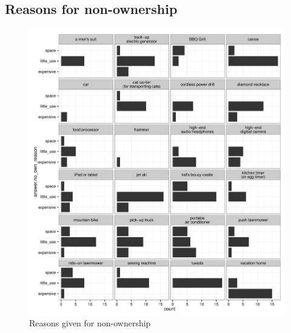 \documentclass[11pt]{article}
\begin{document}
\subsection{Reasons for non-ownership} 


\begin{figure}
\centering 
\caption{Reasons given for non-ownership}
\begin{minipage}{0.90 \linewidth}
\includegraphics[width = \linewidth]{./plots/reasons.pdf} 
\end{minipage} 
\end{figure} 
\end{document}
